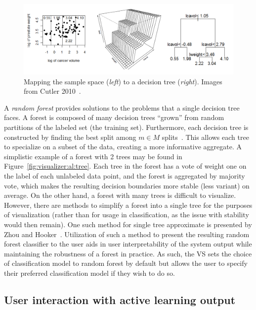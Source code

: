 \begin{figure}[htb]
	\begin{center}
		\includegraphics[width=1\linewidth]{ch-visualizer/figures/decisiontree}
		\caption[Mapping the sample space to a decision tree.]{Mapping the 
		sample space (\textit{left}) to a decision tree (\textit{right}). 
		Images from Cutler 2010~\cite{cutler2010}.}
		\label{fig:visualizer:plotgeneration:tree}
	\end{center}
\end{figure}

A \textit{random forest} provides solutions to the problems that a single 
decision tree faces. A forest is composed of many decision trees 
``grown'' from random partitions of the labeled set (the training set). 
Furthermore, each decision tree is constructed by finding the best split among 
$m \in M$ splits~\cite{cutler2010}. This allows each tree to specialize on a 
subset of the data, 
creating a more informative aggregate. A simplistic example of a forest with 2 
trees may be found in Figure~\ref{fig:visualizer:al:tree}. Each tree in the 
forest has a vote of weight one on the label of each unlabeled data point, and 
the forest is aggregated by majority vote, which makes the resulting decision 
boundaries more stable (less variant) on average. On the other hand, a forest 
with many trees is difficult to visualize. However, there are methods to 
simplify a forest into a single tree for the purposes of visualization (rather 
than for usage in classification, as the issue with stability would then 
remain). One such method for single tree approximate is presented by Zhou and 
Hooker~\cite{zhou2016}. Utilization of such a method to present the resulting 
random forest classifier to the user aids in user interpretability of the 
system output while maintaining the robustness of a forest in practice. 
As such, the VS sets the choice of classification model to random 
forest by default but allows the user to specify their preferred classification 
model if they wish to do so.

\subsection{User interaction with active learning output}
\label{sec:visualizer:plotgeneration:user}

